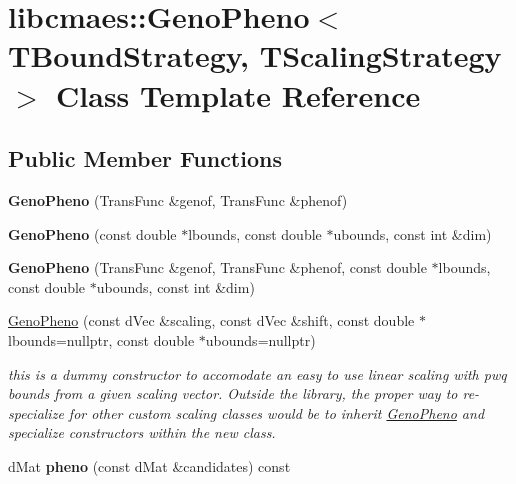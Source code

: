 \hypertarget{classlibcmaes_1_1GenoPheno}{\section{libcmaes\-:\-:Geno\-Pheno$<$ T\-Bound\-Strategy, T\-Scaling\-Strategy $>$ Class Template Reference}
\label{classlibcmaes_1_1GenoPheno}
}
\subsection*{Public Member Functions}
\begin{DoxyCompactItemize}
\item 
\hypertarget{classlibcmaes_1_1GenoPheno_aae14b1407d7f853c55e5f3c693488006}{{\bfseries Geno\-Pheno} (Trans\-Func \&genof, Trans\-Func \&phenof)}\label{classlibcmaes_1_1GenoPheno_aae14b1407d7f853c55e5f3c693488006}

\item 
\hypertarget{classlibcmaes_1_1GenoPheno_a0b4b5ba6314a4ad73a8512ac6f3c096e}{{\bfseries Geno\-Pheno} (const double $\ast$lbounds, const double $\ast$ubounds, const int \&dim)}\label{classlibcmaes_1_1GenoPheno_a0b4b5ba6314a4ad73a8512ac6f3c096e}

\item 
\hypertarget{classlibcmaes_1_1GenoPheno_a76385d259b9f382fe18fdc988bcb68e1}{{\bfseries Geno\-Pheno} (Trans\-Func \&genof, Trans\-Func \&phenof, const double $\ast$lbounds, const double $\ast$ubounds, const int \&dim)}\label{classlibcmaes_1_1GenoPheno_a76385d259b9f382fe18fdc988bcb68e1}

\item 
\hyperlink{classlibcmaes_1_1GenoPheno_a33c22441a0688582c5aa723d8336d3c6}{Geno\-Pheno} (const d\-Vec \&scaling, const d\-Vec \&shift, const double $\ast$lbounds=nullptr, const double $\ast$ubounds=nullptr)
\begin{DoxyCompactList}\small\item\em this is a dummy constructor to accomodate an easy to use linear scaling with pwq bounds from a given scaling vector. Outside the library, the proper way to re-\/specialize for other custom scaling classes would be to inherit \hyperlink{classlibcmaes_1_1GenoPheno}{Geno\-Pheno} and specialize constructors within the new class. \end{DoxyCompactList}\item 
\hypertarget{classlibcmaes_1_1GenoPheno_a19c02b0a3179a3fc5f991b78d639fc5a}{d\-Mat {\bfseries pheno} (const d\-Mat \&candidates) const }\label{classlibcmaes_1_1GenoPheno_a19c02b0a3179a3fc5f991b78d639fc5a}


\end{DoxyCompactItemize}
